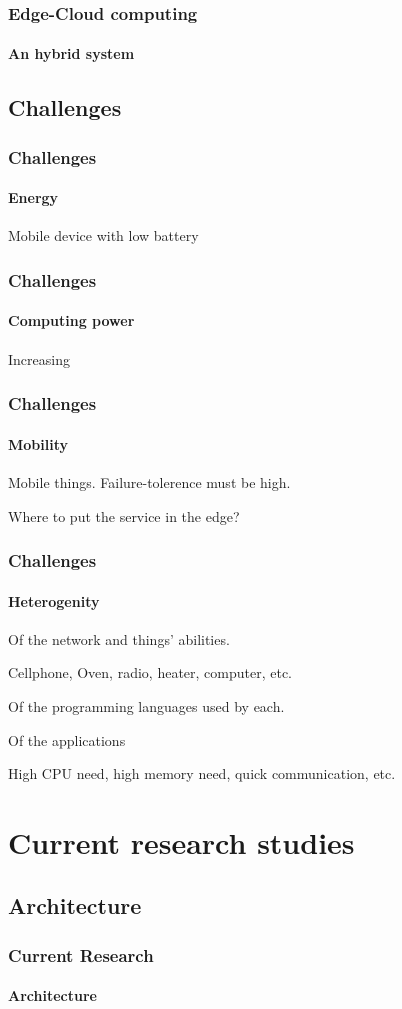 \documentclass[utf8,xcolor=table, page number]{earlywinter}
\begin{document}
\begin{frame}
  \frametitle{Edge-Cloud computing}
  \framesubtitle{An hybrid system}
\end{frame}

\subsection{Challenges}


\begin{frame}
  \frametitle{Challenges}
  \framesubtitle{Energy}
  
  Mobile device with low battery
  
\end{frame}
\begin{frame}
  \frametitle{Challenges}
  \framesubtitle{Computing power}
  
  Increasing
  
\end{frame}
\begin{frame}
  \frametitle{Challenges}
  \framesubtitle{Mobility}
  
  Mobile things. Failure-tolerence must be high.
  
  Where to put the service in the edge?
  
\end{frame}
\begin{frame}
  \frametitle{Challenges}
  \framesubtitle{Heterogenity}
  
  Of the network and things' abilities.
  
	\begin{example}
		Cellphone, Oven, radio, heater, computer, etc.
	\end{example}
  
  Of the programming languages used by each.  
  
  Of the applications
	\begin{example}
		High CPU need, high memory need, quick communication, etc.
	\end{example}
  
\end{frame}

\section{Current research studies}
\subsection{Architecture}
\begin{frame}
  \frametitle{Current Research}
  \framesubtitle{Architecture}
\end{frame}
\end{document}
